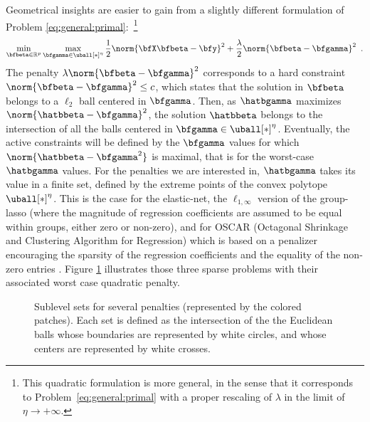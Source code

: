 Geometrical insights are easier to gain from a slightly different formulation of
Problem \eqref{eq:general:primal}:~\footnote{%
  This quadratic formulation is more general, in the sense that it corresponds to
  Problem~\eqref{eq:general:primal} with a proper rescaling of $\lambda$ in the
  limit of $\eta\rightarrow+\infty$.
}
%
\begin{equation}\label{eq:general:dual}
  \min_{\bfbeta\in\mathbb{R}^p} \max_{\bfgamma\in\uball[*]^\eta}
    \frac{1}{2} \norm{\bfX \bfbeta - \bfy}^2 + \frac{\lambda}{2} \norm{\bfbeta - \bfgamma}^2
  \enspace.
\end{equation}
The penalty $\lambda\norm{\bfbeta - \bfgamma}^2$ corresponds to a hard
constraint $\norm{\bfbeta - \bfgamma}^2\leq c$, which states that the 
solution in $\bfbeta$ belongs to a $\ell_{2}$ ball centered in $\bfgamma$.
Then, as $\hatbgamma$ maximizes $\norm{\hatbbeta - \bfgamma}^2$, the
solution $\hatbbeta$ belongs to the intersection of all the balls
centered in $\bfgamma\in\uball[*]^\eta$.
Eventually, the active constraints will be defined by the $\bfgamma$ values for
which $\norm{\hatbbeta - {\bfgamma}^2}$ is maximal, that is for the
worst-case $\hatbgamma$ values. 
For the penalties we are interested in, $\hatbgamma$ takes its value in a
finite set, defined by the extreme points of the convex polytope $\uball[*]^\eta$.
% 
% 
This is the case for the elastic-net,
the $\ell_{1,\infty}$ version of the group-lasso 
(where the magnitude of regression coefficients are assumed to be equal within
groups, either zero or non-zero), 
and for OSCAR (Octagonal Shrinkage and Clustering Algorithm for Regression)
which is based on a penalizer encouraging the sparsity of the regression
coefficients and the equality of the non-zero entries \citep{Bondell08}.
%
Figure \ref{fig:penalties} illustrates  those three  sparse problems
with their  associated worst case quadratic penalty.


% 
\begin{figure}
  \begin{center} 
    \caption{Sublevel sets for several penalties (represented by the 
             colored patches).  
             Each set is defined as the intersection of the the Euclidean balls 
             whose boundaries are represented by white circles, and whose centers are
             represented by white crosses.}
     \label{fig:penalties}
    \end{center} 
\end{figure}


